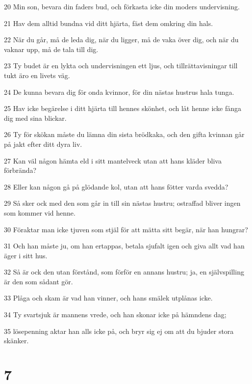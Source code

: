 \par 20 Min son, bevara din faders bud, och förkasta icke din moders undervisning.
\par 21 Hav dem alltid bundna vid ditt hjärta, fäst dem omkring din hals.
\par 22 När du går, må de leda dig, när du ligger, må de vaka över dig, och när du vaknar upp, må de tala till dig.
\par 23 Ty budet är en lykta och undervisningen ett ljus, och tillrättavisningar till tukt äro en livets väg.
\par 24 De kunna bevara dig för onda kvinnor, för din nästas hustrus hala tunga.
\par 25 Hav icke begärelse i ditt hjärta till hennes skönhet, och låt henne icke fånga dig med sina blickar.
\par 26 Ty för skökan måste du lämna din sista brödkaka, och den gifta kvinnan går på jakt efter ditt dyra liv.
\par 27 Kan väl någon hämta eld i sitt mantelveck utan att hans kläder bliva förbrända?
\par 28 Eller kan någon gå på glödande kol, utan att hans fötter varda svedda?
\par 29 Så sker ock med den som går in till sin nästas hustru; ostraffad bliver ingen som kommer vid henne.
\par 30 Föraktar man icke tjuven som stjäl för att mätta sitt begär, när han hungrar?
\par 31 Och han måste ju, om han ertappas, betala sjufalt igen och giva allt vad han äger i sitt hus.
\par 32 Så är ock den utan förstånd, som förför en annans hustru; ja, en självspilling är den som sådant gör.
\par 33 Plåga och skam är vad han vinner, och hans smälek utplånas icke.
\par 34 Ty svartsjuk är mannens vrede, och han skonar icke på hämndens dag;
\par 35 lösepenning aktar han alls icke på, och bryr sig ej om att du bjuder stora skänker.

\chapter{7}

